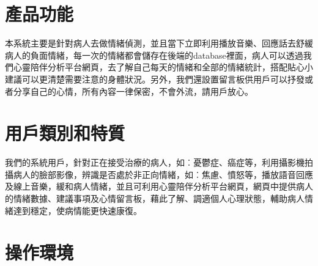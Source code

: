 \documentclass[12pt]{scrreprt}
\begin{document}
\section{產品功能} %
本系統主要是針對病人去做情緒偵測，並且當下立即利用播放音樂、回應話去舒緩病人的負面情緒，每一次的情緒都會儲存在後端的database裡面，病人可以透過我們心靈陪伴分析平台網頁，去了解自己每天的情緒和全部的情緒統計，搭配貼心小建議可以更清楚需要注意的身體狀況。另外，我們還設置留言板供用戶可以抒發或者分享自己的心情，所有內容一律保密，不會外流，請用戶放心。

\section{用戶類別和特質}
我們的系統用戶，針對正在接受治療的病人，如︰憂鬱症、癌症等，利用攝影機拍攝病人的臉部影像，辨識是否處於非正向情緒，如︰焦慮、憤怒等，播放語音回應及線上音樂，緩和病人情緒，並且可利用心靈陪伴分析平台網頁，網頁中提供病人的情緒數據、建議事項及心情留言板，藉此了解、調適個人心理狀態，輔助病人情緒達到穩定，使病情能更快速康復。

\section{操作環境}
\end{document}
